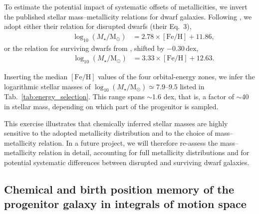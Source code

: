 \documentclass[fleqn,usenatbib]{mnras}
\begin{document}
To estimate the potential impact of systematic offsets of metallicities, we invert the published stellar mass–metallicity relations for dwarf galaxies. Following \citet{Naidu2022b}, we adopt either their relation for disrupted dwarfs (their Eq.~3),
\begin{align}
\qquad\qquad    \log_{10} (M_\star/\mathrm{M_\odot}) &= 2.78 \times \mathrm{[Fe/H]} + 11.86 , \label{eq:naidu}
\end{align}
or the relation for surviving dwarfs from \citet{Kirby2013}, shifted by $-0.30\,\mathrm{dex}$,
\begin{align}
\qquad\qquad    \log_{10} (M_\star/\mathrm{M_\odot}) &= 3.33 \times \mathrm{[Fe/H]} + 12.63 . \label{eq:kirby}
\end{align}

Inserting the median $\mathrm{[Fe/H]}$ values of the four orbital-energy zones, we infer the logarithmic stellar masses of $\log_{10}(M_\star/\mathrm{M_\odot}) \simeq 7.9$–$9.5$ listed in Tab.~\ref{tab:energy_selection}. This range spans $\sim$1.6 dex, that is, a factor of $\sim$40 in stellar mass, depending on which part of the progenitor is sampled. 

This exercise illustrates that chemically inferred stellar masses are highly sensitive to the adopted metallicity distribution and to the choice of mass–metallicity relation. In a future project, we will therefore re-assess the mass–metallicity relation in detail, accounting for full metallicity distributions and for potential systematic differences between disrupted and surviving dwarf galaxies.

\subsection{Chemical and birth position memory of the progenitor galaxy in integrals of motion space} \label{sec:discussion_memory}
\end{document}

